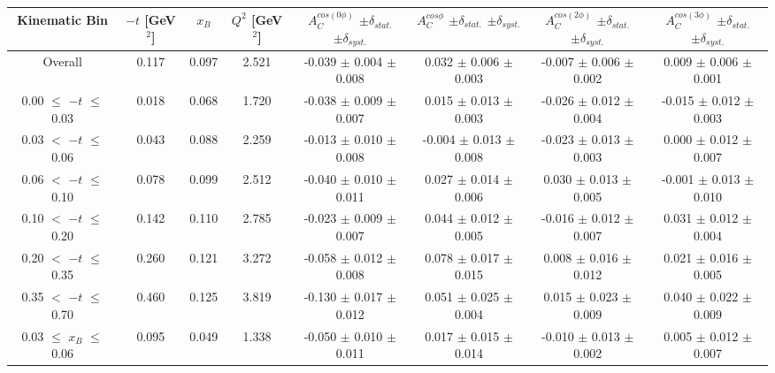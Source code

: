 \begin{table}[width=15cm]
 \begin{center}
\resizebox{16cm}{!} {
  \begin{tabular}{|c|c|c|c|c|c|c|c|}
\hline
Kinematic Bin &  $-t$ [GeV$^{2}$] & $x_{B}$ & $Q^{2}$ [GeV$^{2}$] & 
$A^{cos (0\phi)}_{C}$ $\pm \delta_{stat.}$ $\pm \delta_{syst.}$ & $A^{cos \phi}_{C}$ $\pm \delta_{stat.}$ $\pm \delta_{syst.}$
& $A^{cos (2\phi)}_{C}$ $\pm \delta_{stat.}$ $\pm \delta_{syst.}$ & $A^{cos (3\phi)}_{C}$ $\pm \delta_{stat.}$ $\pm \delta_{syst.}$ \\
\hline
\hline
Overall &  0.117 & 0.097 &  2.521 &  -0.039 $\pm$  0.004 $\pm$  0.008 & 
0.032  $\pm$  0.006 $\pm$   0.003 &  -0.007  $\pm$  0.006  $\pm$   0.002 &  0.009  $\pm$   0.006   $\pm$   0.001 \\
\hline
0.00 $\leqslant$ $-t$ $\leqslant$ 0.03 &  0.018 & 0.068 &  1.720 &  -0.038  $\pm$  0.009 $\pm$ 0.007 & 
0.015  $\pm$  0.013  $\pm$   0.003 &  -0.026  $\pm$  0.012 $\pm$  0.004 &  -0.015   $\pm$  0.012   $\pm$   0.003\\
0.03 $<$ $-t$ $\leqslant$ 0.06 &  0.043 & 0.088 &  2.259& -0.013  $\pm$  0.010  $\pm$   0.008 &
 -0.004 $\pm$  0.013  $\pm$   0.008 &  -0.023  $\pm$  0.013  $\pm$  0.003 &  0.000   $\pm$  0.012   $\pm$   0.007\\
0.06 $<$ $-t$ $\leqslant$ 0.10 &  0.078 & 0.099 &  2.512 & -0.040  $\pm$  0.010  $\pm$  0.011 & 
0.027 $\pm$  0.014  $\pm$   0.006 & 0.030  $\pm$  0.013 $\pm$   0.005 &  -0.001   $\pm$  0.013  $\pm$    0.010\\
0.10 $<$ $-t$ $\leqslant$ 0.20 &  0.142 & 0.110 &  2.785 &  -0.023  $\pm$  0.009   $\pm$  0.007 & 
0.044 $\pm$  0.012  $\pm$   0.005 &  -0.016  $\pm$  0.012  $\pm$  0.007 & 0.031   $\pm$  0.012    $\pm$  0.004\\
0.20 $<$ $-t$ $\leqslant$ 0.35 &  0.260 & 0.121 &  3.272 &  -0.058 $\pm$   0.012  $\pm$  0.008 &
0.078 $\pm$  0.017  $\pm$ 0.015 & 0.008 $\pm$   0.016  $\pm$  0.012 & 0.021  $\pm$   0.016   $\pm$   0.005\\
0.35 $<$ $-t$ $\leqslant$ 0.70 &  0.460 & 0.125 &  3.819 &  -0.130  $\pm$  0.017  $\pm$   0.012 & 
0.051 $\pm$  0.025  $\pm$   0.004 & 0.015 $\pm$   0.023  $\pm$  0.009 & 0.040   $\pm$  0.022   $\pm$ 0.009\\
\hline
0.03 $\leqslant$ $x_{B}$ $\leqslant$ 0.06 &  0.095 & 0.049 &  1.338 &  -0.050  $\pm$  0.010  $\pm$   0.011 & 
 0.017  $\pm$  0.015  $\pm$   0.014 & -0.010 $\pm$  0.013 $\pm$   0.002 &  0.005   $\pm$  0.012  $\pm$    0.007\\

\end{tabular}}
\end{center}
\end{table}
